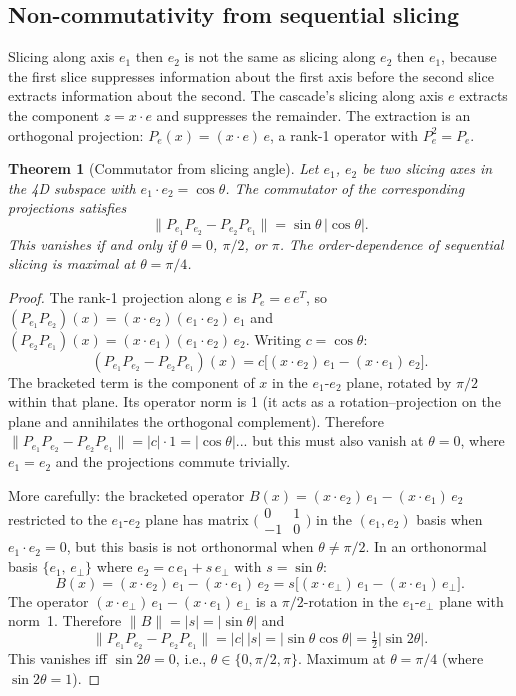 \documentclass[12pt,a4paper]{article}
\newtheorem{theorem}{Theorem}[section]
\begin{document}
\subsection{Non-commutativity from sequential slicing}

Slicing along axis $e_1$ then $e_2$ is not the same as slicing along $e_2$ then $e_1$,
because the first slice suppresses information about the first axis before the second slice
extracts information about the second. The cascade's slicing along axis $e$ extracts the
component $z = x\cdot e$ and suppresses the remainder. The extraction is an orthogonal
projection: $P_e(x) = (x\cdot e)\,e$, a rank-1 operator with $P_e^2 = P_e$.

\begin{theorem}[Commutator from slicing angle]\label{thm:commutator}
Let $e_1$, $e_2$ be two slicing axes in the 4D subspace with $e_1\cdot e_2 = \cos\theta$.
The commutator of the corresponding projections satisfies
\begin{equation}\label{eq:commutator}
\|P_{e_1}P_{e_2} - P_{e_2}P_{e_1}\| = \sin\theta\,|\!\cos\theta|.
\end{equation}
This vanishes if and only if $\theta = 0$, $\pi/2$, or $\pi$. The order-dependence of
sequential slicing is maximal at $\theta = \pi/4$.
\end{theorem}
\begin{proof}
The rank-1 projection along $e$ is $P_e = e\,e^T$, so
$(P_{e_1}P_{e_2})(x) = (x\cdot e_2)(e_1\cdot e_2)\,e_1$ and
$(P_{e_2}P_{e_1})(x) = (x\cdot e_1)(e_1\cdot e_2)\,e_2$. Writing $c = \cos\theta$:
\[
(P_{e_1}P_{e_2} - P_{e_2}P_{e_1})(x) = c\bigl[(x\cdot e_2)\,e_1 - (x\cdot e_1)\,e_2\bigr].
\]
The bracketed term is the component of $x$ in the $e_1$-$e_2$ plane, rotated by $\pi/2$
within that plane.  Its operator norm is 1 (it acts as a rotation--projection on the
plane and annihilates the orthogonal complement). Therefore
$\|P_{e_1}P_{e_2} - P_{e_2}P_{e_1}\| = |c|\cdot 1 = |\!\cos\theta|$... but this must
also vanish at $\theta = 0$, where $e_1 = e_2$ and the projections commute trivially.

More carefully: the bracketed operator $B(x) = (x\cdot e_2)\,e_1 - (x\cdot e_1)\,e_2$
restricted to the $e_1$-$e_2$ plane has matrix
$\bigl(\begin{smallmatrix}0&1\\-1&0\end{smallmatrix}\bigr)$
in the $(e_1,e_2)$ basis when $e_1\cdot e_2 = 0$, but this basis is not orthonormal
when $\theta\neq\pi/2$. In an orthonormal basis $\{e_1,\,e_\perp\}$ where
$e_2 = c\,e_1 + s\,e_\perp$ with $s = \sin\theta$:
\[
B(x) = (x\cdot e_2)\,e_1 - (x\cdot e_1)\,e_2
= s\bigl[(x\cdot e_\perp)\,e_1 - (x\cdot e_1)\,e_\perp\bigr].
\]
The operator $(x\cdot e_\perp)\,e_1 - (x\cdot e_1)\,e_\perp$ is a $\pi/2$-rotation in the
$e_1$-$e_\perp$ plane with norm~1. Therefore $\|B\| = |s| = |\!\sin\theta|$ and
\[
\|P_{e_1}P_{e_2} - P_{e_2}P_{e_1}\| = |c|\,|s| = |\!\sin\theta\cos\theta|
= \tfrac{1}{2}|\!\sin 2\theta|.
\]
This vanishes iff $\sin 2\theta = 0$, i.e., $\theta\in\{0,\pi/2,\pi\}$.
Maximum at $\theta = \pi/4$ (where $\sin 2\theta = 1$).
\end{proof}
\end{document}
